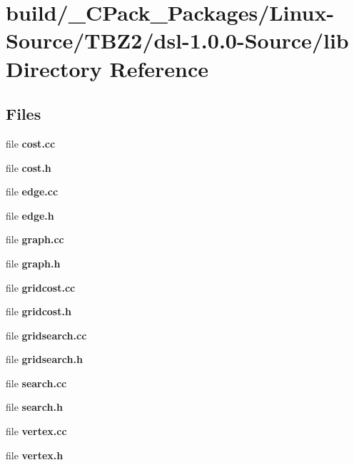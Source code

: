 \section{build/\-\_\-\-C\-Pack\-\_\-\-Packages/\-Linux-\/\-Source/\-T\-B\-Z2/dsl-\/1.0.0-\/\-Source/lib Directory Reference}
\label{dir_6fc87f65d504b0938c1dec245ea50f58}
\subsection*{Files}
\begin{DoxyCompactItemize}
\item 
file {\bf cost.\-cc}
\item 
file {\bf cost.\-h}
\item 
file {\bf edge.\-cc}
\item 
file {\bf edge.\-h}
\item 
file {\bf graph.\-cc}
\item 
file {\bf graph.\-h}
\item 
file {\bf gridcost.\-cc}
\item 
file {\bf gridcost.\-h}
\item 
file {\bf gridsearch.\-cc}
\item 
file {\bf gridsearch.\-h}
\item 
file {\bf search.\-cc}
\item 
file {\bf search.\-h}
\item 
file {\bf vertex.\-cc}
\item 
file {\bf vertex.\-h}
\end{DoxyCompactItemize}
